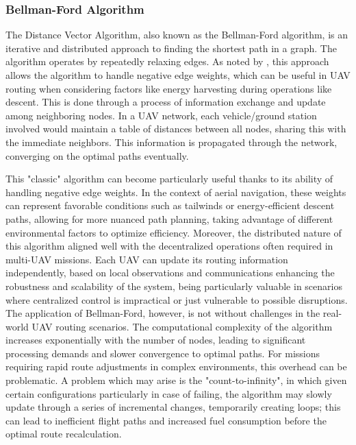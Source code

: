 \documentclass[conference]{IEEEtran}
\begin{document}

\subsubsection{Bellman-Ford Algorithm}

The Distance Vector Algorithm, also known as the Bellman-Ford algorithm, is an iterative and distributed approach to finding the shortest path in a graph. The algorithm operates by repeatedly relaxing edges. As noted by \cite{paper1}, this approach allows the algorithm to handle negative edge weights, which can be useful in UAV routing when considering factors like energy harvesting during operations like descent. This is done through a process of information exchange and update among neighboring nodes. In a UAV network, each vehicle/ground station involved would maintain a table of distances between all nodes, sharing this with the immediate neighbors. This information is propagated through the network, converging on the optimal paths eventually.

This "classic" algorithm can become particularly useful thanks to its ability of handling negative edge weights. In the context of aerial navigation, these weights can represent favorable conditions such as tailwinds or energy-efficient descent paths, allowing for more nuanced path planning, taking advantage of different environmental factors to optimize efficiency. Moreover, the distributed nature of this algorithm aligned well with the decentralized operations often required in multi-UAV missions. Each UAV can update its routing information independently, based on local observations and communications enhancing the robustness and scalability of the system, being particularly valuable in scenarios where centralized control is impractical or just vulnerable to possible disruptions. \\

The application of Bellman-Ford, however, is not without challenges in the real-world UAV routing scenarios. The computational complexity of the algorithm increases exponentially with the number of nodes, leading to significant processing demands and slower convergence to optimal paths. For missions requiring rapid route adjustments in complex environments, this overhead can be problematic. A problem which may arise is the "count-to-infinity", in which given certain configurations particularly in case of failing, the algorithm may slowly update through a series of incremental changes, temporarily creating loops; this can lead to inefficient flight paths and increased fuel consumption before the optimal route recalculation. \\
\end{document}
